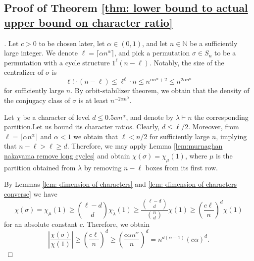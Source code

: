 \documentclass[11pt, letterpaper]{amsart}
\renewcommand\ge{\geqslant}
\renewcommand\le{\leqslant}
\newcommand{\NN}{\mathbb{N}}
\begin{document}
\subsection{Proof of Theorem \ref{thm: lower bound to actual upper bound on character ratio}}
\begin{proof}[\unskip\nopunct]
Let $c>0$ to be chosen later, let $\alpha \in (0,1)$, and let $n \in \NN$ be a sufficiently large integer. We denote $\ell = \lceil \alpha n^\alpha \rceil$, and pick a permutation $\sigma \in S_n$ to be a permutation with a cycle structure $1^\ell (n-\ell)$. Notably, the size of the centralizer of $\sigma$ is 
\[
    \ell!\cdot(n-\ell)\le\ell^{\ell}\cdot n\le n^{\alpha n^{\alpha}+2}\le n^{2\alpha n^{\alpha}}
\]
for sufficiently large $n$. By orbit-stabilizer theorem, we obtain that the density of the conjugacy class of $\sigma$ is at least $n^{-2 \alpha n^{\alpha}}$.

Let $\chi$ be a character of level $d \le 0.5\alpha n^{\alpha}$, and denote by $\lambda \vdash n$ the corresponding partition.Let us bound its character ratios. Clearly, $d \le \ell/2$. Moreover, from $\ell = \lceil \alpha n^\alpha \rceil$ and $\alpha<1$ we obtain that $\ell<n/2$ for sufficiently large $n$, implying that $n-\ell>\ell\ge d$. Therefore, we may apply Lemma \ref{lem:murnaghan nakayama remove long cycles} and obtain $\chi(\sigma) = \chi_{\mu}(1)$, where $\mu$ is the partition obtained from $\lambda$ by removing $n-\ell$ boxes from its first row.

By Lemmas \ref{lem: dimension of characters} and \ref{lem: dimension of characters converse} we have
\[\chi(\sigma) = \chi_{\mu}(1)\ge \binom{\ell-d}{d} \chi_{\tilde{\lambda}}(1)\ge \frac{\binom{\ell-d}{d}}{\binom{n}{d}} \chi(1)\ge \left(\frac{c\ell}{n}\right)^d \chi(1)\]
for an absolute constant $c$. Therefore, we obtain
\[
    \left|\frac{\chi(\sigma)}{\chi(1)}\right|\ge\left(\frac{c\ell}{n}\right)^{d}\ge\left(\frac{c\alpha n^{\alpha}}{n}\right)^{d}=n^{d(\alpha-1)}\left(c\alpha\right)^{d}.
\]
\end{proof}
\end{document}

